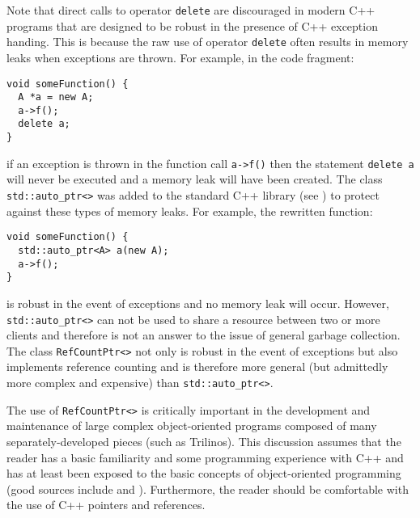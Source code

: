 \documentclass[pdf,ps2pdf,11pt]{SANDreport}
\begin{document}
Note that direct calls to operator {}\texttt{delete} are discouraged
in modern C++ programs that are designed to be robust in the presence
of C++ exception handing.  This is because the raw use of operator
{}\texttt{delete} often results in memory leaks when exceptions are
thrown.  For example, in the code fragment:

{\small\begin{verbatim}
void someFunction() {
  A *a = new A;
  a->f();
  delete a;
}
\end{verbatim}}

{}\noindent{}if an exception is thrown in the function call
{}\texttt{a->f()} then the statement {}\texttt{delete a} will never be
executed and a memory leak will have been created.  The class
{}\texttt{std::auto\_\-ptr<>} was added to the standard C++ library
(see {}\cite[Items 9 and 10]{ref:meyers_1996}) to protect against
these types of memory leaks.  For example, the rewritten function:

{\small\begin{verbatim}
void someFunction() {
  std::auto_ptr<A> a(new A);
  a->f();
}
\end{verbatim}}

{}\noindent{}is robust in the event of exceptions and no memory leak
will occur.  However, {}\texttt{std::auto\_\-ptr<>} can not be used to
share a resource between two or more clients and therefore is not an
answer to the issue of general garbage collection.  The class
{}\texttt{Ref\-Count\-Ptr<>} not only is robust in the event of
exceptions but also implements reference counting and is therefore
more general (but admittedly more complex and expensive) than
{}\texttt{std::auto\_\-ptr<>}.

The use of {}\texttt{Ref\-Count\-Ptr<>} is critically important in the
development and maintenance of large complex object-oriented programs
composed of many separately-developed pieces (such as Trilinos).  This
discussion assumes that the reader has a basic familiarity and some
programming experience with C++ and has at least been exposed to the
basic concepts of object-oriented programming (good sources include
{}\cite{ref:gama_et_al_1995} and {}\cite{ref:stroustrup_2000}).
Furthermore, the reader should be comfortable with the use of C++
pointers and references.
\end{document}
